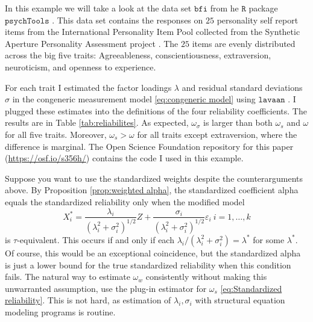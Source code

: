 \documentclass[twoside]{article}
\renewcommand{\sqrt}[1]{{(#1)^{1/2}}}
\begin{document}
\begin{example}
\label{exa:reliabilities}


In this example we will take a look at the data set $\texttt{bfi}$ from he $\texttt{R}$ \citep{Team2013-tt} package $\texttt{psychTools}$ \citep{Revelle2019-te}. This data set contains the responses on $25$ personality self report items from the International Personality Item Pool \citep{Goldberg1999-iz} collected from the Synthetic Aperture Personality Assessment project \citep{Revelle2017-ez}. The $25$ items are evenly distributed across the big five traits: Agreeableness, conscientiousness, extraversion, neuroticism, and openness to experience. 

For each trait I estimated the factor loadings $\lambda$ and residual standard deviations $\sigma$ in the congeneric measurement model \eqref{eq:congeneric model} using  $\texttt{lavaan}$ \citep{Rosseel2012-yg}. I plugged these estimates into the definitions of the four reliability coefficients. The results are in Table \ref{tab:reliabilites}. As expected, $\omega_\sigma$ is larger than both $\omega_s$ and $\omega$ for all five traits. Moreover, $\omega_s > \omega$ for all traits except extraversion, where the difference is marginal. The Open Science Foundation repository for this paper (\url{https://osf.io/s356h/}) contains the code I used in this example.
\end{example} 

Suppose you want to use the standardized weights despite the counterarguments above. By Proposition \ref{prop:weighted alpha}, the standardized coefficient alpha equals the standardized reliability only when the modified model
\begin{equation}\label{eq:std-modified model}
X_{i}^{*}=\frac{\lambda_{i}}{\sqrt{\lambda_{i}^{2}+\sigma_{i}^{2}}}Z+\frac{\sigma_{i}}{\sqrt{\lambda_{i}^{2}+\sigma_{i}^{2}}}\varepsilon_{i}\:i=1,\ldots,k    \end{equation}
is $\tau$-equivalent. This occurs if and only if each $\lambda_{i}/(\lambda_{i}^{2}+\sigma_{i}^{2})=\lambda^{*}$
for some $\lambda^{*}$. Of course, this would be an exceptional coincidence, but the standardized alpha is just a lower bound for the true standardized reliability when this condition fails. The natural way to estimate $\omega_w$ consistently without making this unwarranted assumption, use the plug-in estimator for $\omega_s$ \eqref{eq:Standardized reliability}. This is not hard, as estimation of $\lambda_{i},\sigma_{i}$ with structural equation modeling programs is routine.
\end{document}
